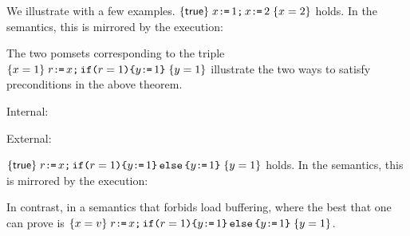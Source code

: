 

We illustrate with a few examples.
$\hoare{\TRUE}{x\GETS 1 \SEMI x \GETS 2}{x=2} $ holds.   In the semantics, this is mirrored by the execution:
\begin{tikzdisplay}[node distance=1em]
\end{tikzdisplay}

The two pomsets corresponding to the triple $\hoare{x=1}{r \GETS x \SEMI \IF{r=1} \THEN y \GETS 1\FI}{y=1}$ illustrate the two ways to satisfy preconditions in the above theorem.
\begin{displaymathsmall}
\mbox{Internal: }
\begin{tikzcenter}
\end{tikzcenter}
\qquad \qquad
\mbox{External: }
\begin{tikzcenter}
\end{tikzcenter}
\end{displaymathsmall}

$\hoare{\TRUE}{r \GETS x \SEMI \IF{r=1} \THEN y \GETS 1 \ELSE y \GETS 1 \FI}{y=1} $ holds.  
In the semantics, this is mirrored by the execution:
\begin{tikzdisplay}[node distance=1em]
\end{tikzdisplay}
In contrast, in a semantics that forbids load buffering, where the best that one can prove is
$\hoare{x=v} {r \GETS x \SEMI \IF{r=1} \THEN y \GETS 1 \ELSE y \GETS 1 \FI}{y= 1}
$.

